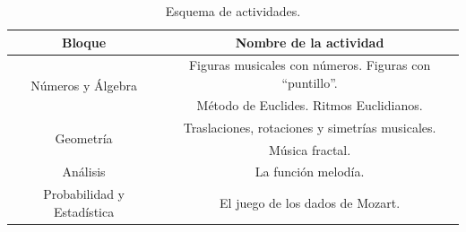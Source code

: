 \documentclass[a4paper, openright, 11pt, titlepage]{report}
\theoremstyle{definition}\newtheorem{defin}[propo]{Definition}
\theoremstyle{definition}\newtheorem{obser}[propo]{Remark}
\theoremstyle{definition}\newtheorem{ejem}[propo]{Ejemplo}
\theoremstyle{definition}\newtheorem{algoritmo}[propo]{Algoritmo}
\begin{document}
\begin{table}[H]
    \centering
    \begin{tabular}{|c|c|}
    \hline
      Bloque & Nombre de la actividad \\
      \hline \hline
      \multirow{2}{*}{Números y Álgebra} & Figuras musicales con números. Figuras con ``puntillo''. \\ 
      \cline{2-2}
      & Método de Euclides. Ritmos Euclidianos. \\
      \hline
      \multirow{2}{*}{Geometría} & Traslaciones, rotaciones y simetrías musicales. \\
      \cline{2-2}
      & Música fractal. \\
      \hline
      Análisis & La función melodía.\\
      \hline
      Probabilidad y Estadística & El juego de los dados de Mozart.\\
      \hline
    \end{tabular}
    \caption{Esquema de actividades.}
\end{table}
\end{document}
